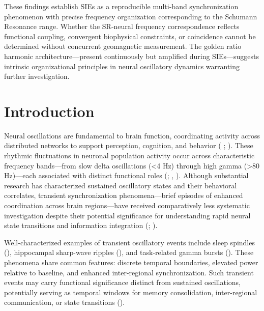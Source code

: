 \documentclass[11pt,a4paper]{article}
\begin{document}
These findings establish SIEs as a reproducible multi-band synchronization phenomenon with precise frequency organization corresponding to the Schumann Resonance range. Whether the SR-neural frequency correspondence reflects functional coupling, convergent biophysical constraints, or coincidence cannot be determined without concurrent geomagnetic measurement. The golden ratio harmonic architecture—present continuously but amplified during SIEs—suggests intrinsic organizational principles in neural oscillatory dynamics warranting further investigation.
\newpage
\tableofcontents
\newpage
\section{Introduction}
Neural oscillations are fundamental to brain function, coordinating activity across distributed networks to support perception, cognition, and behavior ( \cite{gy_rgy_buzs_ki_c98dac5c}; \cite{pascal_fries_7b9d1ced}). These rhythmic fluctuations in neuronal population activity occur across characteristic frequency bands—from slow delta oscillations (<4 Hz) through high gamma (>80 Hz)—each associated with distinct functional roles (\cite{wolfgang_klimesch_be1f7786}; \cite{engel2010beta}, \cite{cohen2017where}). Although substantial research has characterized sustained oscillatory states and their behavioral correlates, transient synchronization phenomena—brief episodes of enhanced coordination across brain regions—have received comparatively less systematic investigation despite their potential significance for understanding rapid neural state transitions and information integration (\cite{siegel2012spectral}; \cite{canolty2010functional}).

Well-characterized examples of transient oscillatory events include sleep spindles (\cite{fernandez2020sleep}), hippocampal sharp-wave ripples (\cite{buzsaki2015hippocampal}), and task-related gamma bursts (\cite{fries2001modulation}). These phenomena share common features: discrete temporal boundaries, elevated power relative to baseline, and enhanced inter-regional synchronization. Such transient events may carry functional significance distinct from sustained oscillations, potentially serving as temporal windows for memory consolidation, inter-regional communication, or state transitions (\cite{john_lisman_100e4cf6}).
\end{document}
